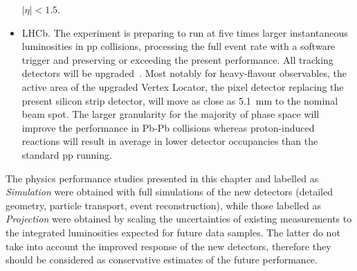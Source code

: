 \begin{itemize}
$|\eta|<1.5$. 
\item  LHCb. The experiment is preparing to run at five times larger instantaneous luminosities in pp collisions, processing the full event rate with a software trigger and preserving or exceeding the present performance.
All tracking detectors will be upgraded~\cite{Collaboration:1624070,Collaboration:1647400}. 
Most notably for heavy-flavour observables, the active area of the upgraded Vertex Locator, the pixel detector replacing the present silicon strip detector, will move as close as 5.1~mm to the nominal beam spot.
The larger granularity for the majority of phase space will improve the performance in Pb-Pb collisions whereas proton-induced reactions will result in average in lower detector occupancies than the standard pp running.  
\end{itemize}

The physics performance studies presented in this chapter and labelled as {\it Simulation} were obtained with full simulations of the new detectors (detailed geometry, particle transport, event reconstruction), while those labelled as {\it Projection}
were obtained by scaling the uncertainties of existing measurements to the integrated luminosities expected for future data samples. The latter do not take into account the improved response of the new detectors, therefore they should be considered as conservative estimates of the future performance.